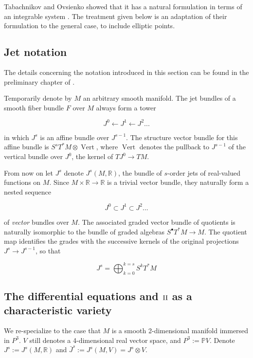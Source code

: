 \documentclass[11pt]{article}
\numberwithin{equation}{section}
\theoremstyle{plain}
\theoremstyle{remark}
\renewcommand{\P}{\mathbb{P}}
\newcommand{\R}{\mathbb{R}}
\newcommand{\II}{\textnormal{II}}
\begin{document}
Tabachnikov and Ovsienko showed that it has a natural formulation in terms of an integrable system \cite{to}. The treatment given below is an adaptation of their formulation to the general case, to include elliptic points.

\subsection{Jet notation}
 
The details concerning the notation introduced in this section can be found in the preliminary chapter of \cite{gromovPDR}.

Temporarily denote by $M$ an arbitrary smooth manifold. The jet bundles of a smooth fiber bundle $F$ over $M$ always form a tower

\[J^{0}\leftarrow J^{1} \leftarrow J^{2} ...\]

in which $J^{s}$ is an affine bundle over $J^{s-1}$. The structure vector bundle for this affine bundle is $S^{s}T^{*}M\otimes \operatorname{Vert}$, where $\operatorname{Vert}$ denotes the pullback to $J^{s-1}$ of the vertical bundle over $J^{0}$, the kernel of $TJ^{0}\rightarrow  TM$.

From now on let $J^{s}$ denote $J^{s}(M,\R)$, the bundle of $s$-order jets of real-valued functions on $M$. Since $M\times \R \rightarrow  \R$ is a trivial vector bundle, they naturally form a nested sequence

\[J^{0}\subset J^{1}\subset J^{2} ...\]

of \emph{vector} bundles over $M$. The associated graded vector bundle of quotients is naturally isomorphic to the bundle of graded algebras $S^{\bullet}T^{*}M\rightarrow  M$. The quotient map identifies the grades with the successive kernels of the original projections $J^{s}\rightarrow  J^{s-1}$, so that

\[ J^{s} = \bigoplus_{k=0}^{k=s} S^{k}T^{*}M \]


\subsection{The differential equations and $\II$ as a characteristic variety}

We re-specialize to the case that $M$ is a smooth 2-dimensional manifold immersed in $P^{3}$. $V$ still denotes a 4-dimensional real vector space, and $P^{3}:=\P V$. Denote $J^{s}:=J^{s}(M,\R)$ and $\bar{J}^{s}:=J^{s}(M,V)=J^{s}\otimes V$.
\end{document}
